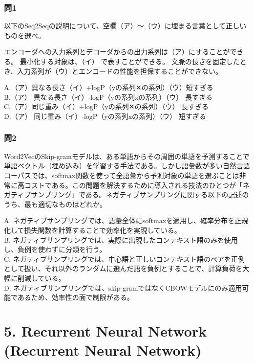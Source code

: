 \documentclass[
  letterpaper,
  DIV=11,
  numbers=noendperiod]{scrreprt}
\begin{document}
\subsection{問1}\label{ux554f1-5}

以下のSeq2Seqの説明について、空欄（ア）～（ウ）に埋まる言葉として正しいものを選べ。

エンコーダへの入力系列とデコーダからの出力系列は（ア）にすることができる。
最小化する対象は、（イ） で表すことができる。
文脈の長さを固定したとき、入力系列が（ウ）とエンコードの性能を担保することができない。

A.（ア）異なる長さ（イ）+logP（yの系列\textbar✕の系列）（ウ）短すぎる\\
B.（ア） 異なる長さ（イ）-logP（yの系列\textbar xの系列）（ウ）
長すぎる\\
C.（ア）同じ重み（イ）+logP（yの系列\textbar✕の系列）（ウ） 長すぎる\\
D.（ア） 同じ重み（イ）-logP（yの系列xの系列）（ウ） 短すぎる

\subsection{問2}\label{ux554f2-3}

Word2VecのSkip-gramモデルは、ある単語からその周囲の単語を予測することで単語ベクトル（埋め込み）を学習する手法である。しかし語彙数が多い自然言語コーパスでは、softmax関数を使って全語彙から予測対象の単語を選ぶことは非常に高コストである。この問題を解決するために導入される技法のひとつが「ネガティブサンプリング」である。ネガティブサンプリングに関する以下の記述のうち、最も適切なものはどれか。

A.
ネガティブサンプリングでは、語彙全体にsoftmaxを適用し、確率分布を正規化して損失関数を計算することで効率化を実現している。\\
B.
ネガティブサンプリングでは、実際に出現したコンテキスト語のみを使用し、負例を使わずに分類を行う。\\
C.
ネガティブサンプリングでは、中心語と正しいコンテキスト語のペアを正例として扱い、それ以外のランダムに選んだ語を負例とすることで、計算負荷を大幅に削減している。\\
D.
ネガティブサンプリングでは、skip-gramではなくCBOWモデルにのみ適用可能であるため、効率性の面で制限がある。

\chapter{5. Recurrent Neural Network (Recurrent Neural
Network)}\label{recurrent-neural-network-recurrent-neural-network}
\end{document}
